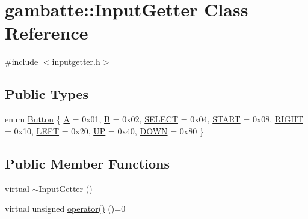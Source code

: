 \hypertarget{classgambatte_1_1InputGetter}{}\section{gambatte\+:\+:Input\+Getter Class Reference}
\label{classgambatte_1_1InputGetter}


{\ttfamily \#include $<$inputgetter.\+h$>$}

\subsection*{Public Types}
\begin{DoxyCompactItemize}
\item 
enum \hyperlink{classgambatte_1_1InputGetter_a87fe4c12a05992f649a66a6a76f6fdf7}{Button} \{ \newline
\hyperlink{classgambatte_1_1InputGetter_a87fe4c12a05992f649a66a6a76f6fdf7aa63a9dbf0e8e3610f2156fc886154901}{A} = 0x01, 
\hyperlink{classgambatte_1_1InputGetter_a87fe4c12a05992f649a66a6a76f6fdf7aff6e26dc5c5d71b82cd1f51ad8508983}{B} = 0x02, 
\hyperlink{classgambatte_1_1InputGetter_a87fe4c12a05992f649a66a6a76f6fdf7a27d5adca30e600007ca422bfc96a0ea3}{S\+E\+L\+E\+CT} = 0x04, 
\hyperlink{classgambatte_1_1InputGetter_a87fe4c12a05992f649a66a6a76f6fdf7a0259749e3c1591440e1833e695f16b26}{S\+T\+A\+RT} = 0x08, 
\newline
\hyperlink{classgambatte_1_1InputGetter_a87fe4c12a05992f649a66a6a76f6fdf7aab3c49a3714286ca22cd499261f49f84}{R\+I\+G\+HT} = 0x10, 
\hyperlink{classgambatte_1_1InputGetter_a87fe4c12a05992f649a66a6a76f6fdf7afd3797710c0edeb077ef87a83089b874}{L\+E\+FT} = 0x20, 
\hyperlink{classgambatte_1_1InputGetter_a87fe4c12a05992f649a66a6a76f6fdf7af495ecafeb96853df875e66f068c9cba}{UP} = 0x40, 
\hyperlink{classgambatte_1_1InputGetter_a87fe4c12a05992f649a66a6a76f6fdf7a010b0ea266b38b531fd66172770e0a5b}{D\+O\+WN} = 0x80
 \}
\end{DoxyCompactItemize}
\subsection*{Public Member Functions}
\begin{DoxyCompactItemize}
\item 
virtual \hyperlink{classgambatte_1_1InputGetter_a3cf4b57135018738905d7bf62062240f}{$\sim$\+Input\+Getter} ()
\item 
virtual unsigned \hyperlink{classgambatte_1_1InputGetter_afe2d592abb64686ea9ab98513a51afb0}{operator()} ()=0
\end{DoxyCompactItemize}


